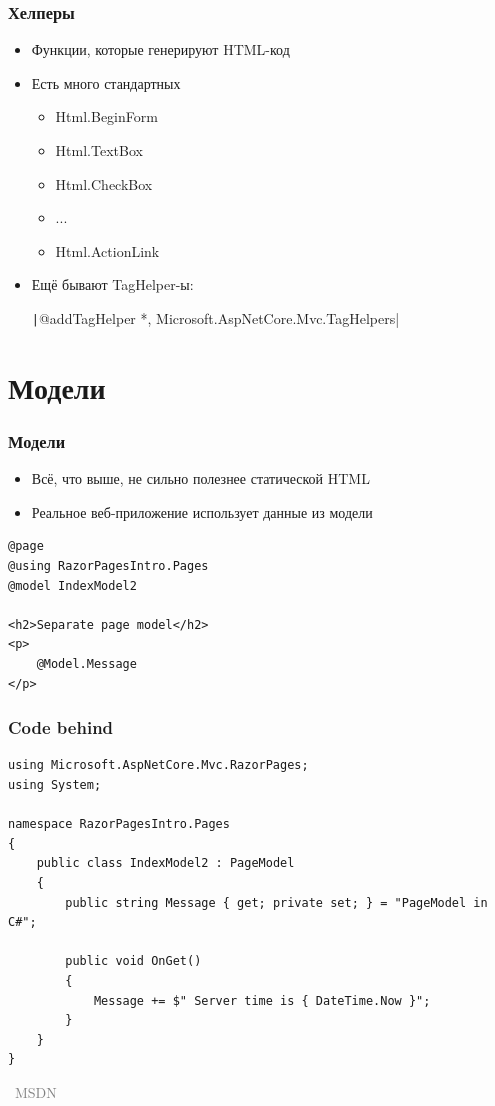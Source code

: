 \documentclass[xetex,mathserif,serif]{beamer}
\newcommand{\attribution}[1] {
\vspace{-5mm}\begin{flushright}\begin{scriptsize}\textcolor{gray}{\textcopyright\, #1}\end{scriptsize}\end{flushright}
}
\begin{document}
	\begin{frame}
		\frametitle{Хелперы}
		\begin{itemize}
			\item Функции, которые генерируют HTML-код
			\item Есть много стандартных
			\begin{itemize}
				\item Html.BeginForm
				\item Html.TextBox
				\item Html.CheckBox
				\item ...
				\item Html.ActionLink
			\end{itemize}
			\item Ещё бывают TagHelper-ы:
			
			\texttt|@addTagHelper *, Microsoft.AspNetCore.Mvc.TagHelpers|
		\end{itemize}
	\end{frame}

	\section{Модели}

	\begin{frame}[fragile]
		\frametitle{Модели}
		\begin{itemize}
			\item Всё, что выше, не сильно полезнее статической HTML
			\item Реальное веб-приложение использует данные из модели
		\end{itemize}
		\begin{verbatim}
@page
@using RazorPagesIntro.Pages
@model IndexModel2

<h2>Separate page model</h2>
<p>
    @Model.Message
</p>
		\end{verbatim}
	\end{frame}

	\begin{frame}[fragile]
		\frametitle{Code behind}
		\begin{small}
			\begin{verbatim}
using Microsoft.AspNetCore.Mvc.RazorPages;
using System;

namespace RazorPagesIntro.Pages
{
    public class IndexModel2 : PageModel
    {
        public string Message { get; private set; } = "PageModel in C#";

        public void OnGet()
        {
            Message += $" Server time is { DateTime.Now }";
        }
    }
}
			\end{verbatim}
		\end{small}
		\attribution{MSDN}
	\end{frame}
\end{document}
